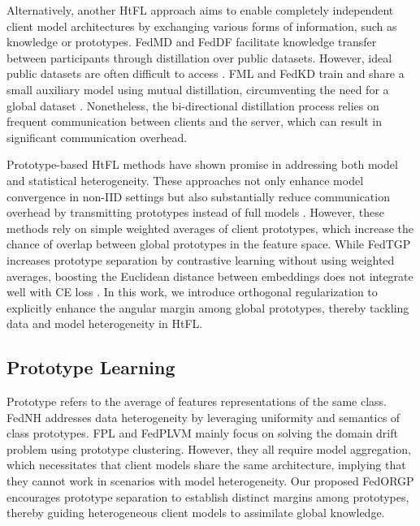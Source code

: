 Alternatively, another HtFL approach aims to enable completely independent client model architectures by exchanging various forms of information, such as knowledge or prototypes. FedMD \cite{li2019fedmd} and FedDF \cite{FedDF} facilitate knowledge transfer between participants through distillation over public datasets. However, ideal public datasets are often difficult to access \cite{public_dataset_is_difficult_to_obtain}. FML \cite{fml} and FedKD \cite{fedkd} train and share a small auxiliary model using mutual distillation, circumventing the need for a global dataset \cite{fedtgp}. Nonetheless, the bi-directional distillation process relies on frequent communication between clients and the server, which can result in significant communication overhead.

Prototype-based HtFL methods \cite{tan2022fedproto,FedPCL,FedPAC} have shown promise in addressing both model and statistical heterogeneity. These approaches not only enhance model convergence in non-IID settings but also substantially reduce communication overhead by transmitting prototypes instead of full models \cite{FedPCL}. However, these methods rely on simple weighted averages of client prototypes, which increase the chance of overlap between global prototypes in the feature space. While FedTGP \cite{fedtgp} increases prototype separation by contrastive learning without using weighted averages, boosting the Euclidean distance between embeddings does not integrate well with CE loss \cite{opl, comprehensive-survey-of-distance}. In this work, we introduce orthogonal regularization to explicitly enhance the angular margin among global prototypes, thereby tackling data and model heterogeneity in HtFL.

\subsection{Prototype Learning}
Prototype refers to the average of features representations of the same class. FedNH \cite{FedNH} addresses data heterogeneity by leveraging uniformity and semantics of class prototypes. FPL \cite{FPL} and FedPLVM \cite{FedPLVM} mainly focus on solving the domain drift problem using prototype clustering. However, they all require model aggregation, which necessitates that client models share the same architecture, implying that they cannot work in scenarios with model heterogeneity. Our proposed FedORGP encourages prototype separation to establish distinct margins among prototypes, thereby guiding heterogeneous client models to assimilate global knowledge.

